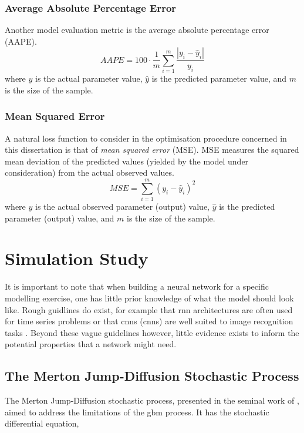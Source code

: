 \documentclass[11pt,oneside,openany,a4paper,english, report, goldenblock
]{usthesis}
\begin{document}
\subsection{Average Absolute Percentage Error}
Another model evaluation metric is the average absolute percentage error (AAPE).
\begin{equation}
AAPE = 100 \cdot \frac{1}{m} \sum_{i=1}^{m} \frac{\left| y_i - \hat{y}_i \right|}{y_i}
\end{equation}
where $y$ is the actual parameter value, $\hat{y}$ is the predicted parameter value, and $m$ is the size of the sample.

\subsection{Mean Squared Error}
A natural loss function to consider in the optimisation procedure concerned in this dissertation is that of \textit{mean squared error} (MSE). MSE measures the squared mean deviation of the predicted values (yielded by the model under consideration) from the actual observed values.
\begin{equation}
MSE = \sum_{i=1}^{m}\left(y_i-\hat{y}_i\right)^2
\end{equation}
where $y$ is the actual observed parameter (output) value, $\hat{y}$ is the predicted parameter (output) value, and $m$ is the size of the sample.

\chapter{Simulation Study}
\label{chapter:simulation_study}

It is important to note that when building a neural network for a specific modelling exercise, one has little prior knowledge of what the model should look like. Rough guidlines do exist, for example that \acrfull{rnn} architectures are often used for time series problems \citep{Karpathy} or that \acrlong{cnn}s (\acrshort{cnn}s) are well suited to image recognition tasks \citep{LISALab}. Beyond these vague guidelines however, little evidence exists to inform the potential properties that a network might need.

\section{The Merton Jump-Diffusion Stochastic Process}

The Merton Jump-Diffusion stochastic process, presented in the seminal work of \citet{Merton}, aimed to address the limitations of the \acrshort{gbm} process. It has the stochastic differential equation,
\end{document}
